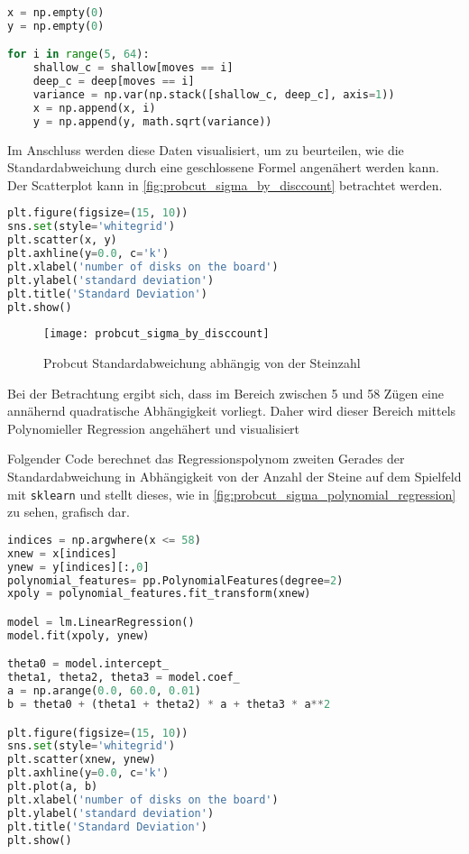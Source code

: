 \begin{lstlisting}[language=Python]
x = np.empty(0)
y = np.empty(0)

for i in range(5, 64):
    shallow_c = shallow[moves == i]
    deep_c = deep[moves == i]
    variance = np.var(np.stack([shallow_c, deep_c], axis=1))
    x = np.append(x, i)
    y = np.append(y, math.sqrt(variance))
\end{lstlisting}

Im Anschluss werden diese Daten visualisiert, um zu beurteilen, wie die
Standardabweichung durch eine geschlossene Formel angenähert werden
kann. Der Scatterplot kann in \autoref{fig:probcut_sigma_by_disccount}
betrachtet werden.

\begin{lstlisting}[language=Python]
plt.figure(figsize=(15, 10))
sns.set(style='whitegrid')
plt.scatter(x, y)
plt.axhline(y=0.0, c='k')
plt.xlabel('number of disks on the board')
plt.ylabel('standard deviation')
plt.title('Standard Deviation')
plt.show()
\end{lstlisting}

\begin{figure}[H]
    \centering
    \texttt{[image: probcut\_sigma\_by\_disccount]}
    \caption{Probcut Standardabweichung abhängig von der Steinzahl}
    \label{fig:probcut_sigma_by_disccount}
\end{figure}

Bei der Betrachtung ergibt sich, dass im Bereich zwischen 5 und 58 Zügen
eine annähernd quadratische Abhängigkeit vorliegt. Daher wird dieser
Bereich mittels Polynomieller Regression angehähert und visualisiert

Folgender Code berechnet das Regressionspolynom zweiten Gerades der
Standardabweichung in Abhängigkeit von der Anzahl der Steine auf dem
Spielfeld mit \passthrough{\lstinline!sklearn!} und stellt dieses, wie
in \autoref{fig:probcut_sigma_polynomial_regression} zu sehen, grafisch
dar.

\begin{lstlisting}[language=Python]
indices = np.argwhere(x <= 58)
xnew = x[indices]
ynew = y[indices][:,0]
polynomial_features= pp.PolynomialFeatures(degree=2)
xpoly = polynomial_features.fit_transform(xnew)

model = lm.LinearRegression()
model.fit(xpoly, ynew)

theta0 = model.intercept_
theta1, theta2, theta3 = model.coef_
a = np.arange(0.0, 60.0, 0.01)
b = theta0 + (theta1 + theta2) * a + theta3 * a**2

plt.figure(figsize=(15, 10))
sns.set(style='whitegrid')
plt.scatter(xnew, ynew)
plt.axhline(y=0.0, c='k')
plt.plot(a, b)
plt.xlabel('number of disks on the board')
plt.ylabel('standard deviation')
plt.title('Standard Deviation')
plt.show()
\end{lstlisting}

